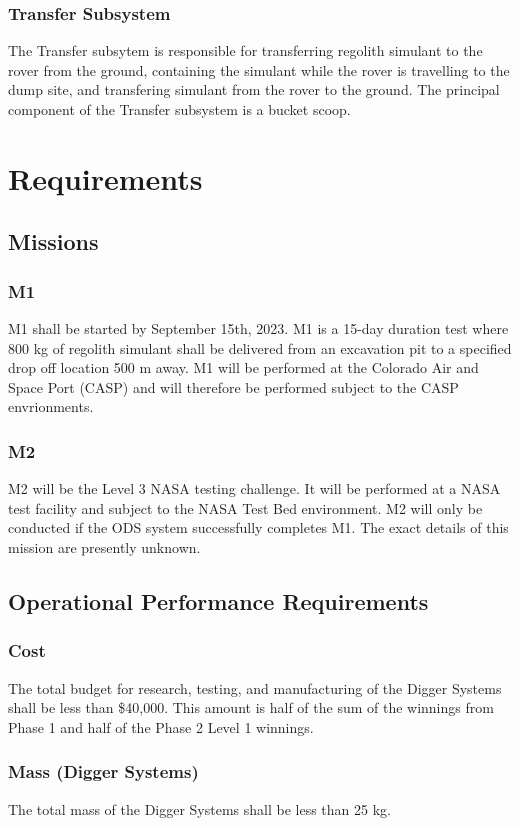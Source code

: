 \subsubsection{Transfer Subsystem}
The Transfer subsytem is responsible for transferring  regolith simulant to the rover from the ground, containing the simulant while the rover is travelling to the dump site, and transfering simulant from the rover to the ground. The principal component of the Transfer subsystem is a bucket scoop.
\newpage
\section{Requirements}
\subsection{Missions}
\subsubsection{M1}
M1 shall be started by September 15th, 2023. M1 is a 15-day duration test where 800 kg of regolith simulant shall be delivered from an excavation pit to a specified drop off location 500 m away. M1 will be performed at the Colorado Air and Space Port (CASP) and will therefore be performed subject to the CASP envrionments.
\subsubsection{M2}
M2 will be the Level 3 NASA testing challenge. It will be performed at a NASA test facility and subject to the NASA Test Bed environment. M2 will only be conducted if the ODS system successfully completes M1. The exact details of this mission are presently unknown.
\subsection{Operational Performance Requirements}
\subsubsection{Cost}
The total budget for research, testing, and manufacturing of the Digger Systems shall be less than \$40,000. This amount is half of the sum of the winnings from Phase 1 and half of the Phase 2 Level 1 winnings.  
\subsubsection{Mass (Digger Systems)}
The total mass of the Digger Systems shall be less than 25 kg.
